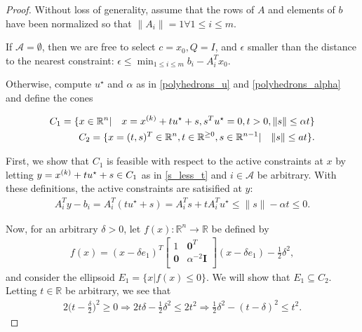 \begin{proof}

Without loss of generality, assume that the rows of $A$ and elements of $b$ have been normalized so that $\|A_i\| = 1 \forall 1 \le i \le m$.

If $\mathcal A = \emptyset$, then we are free to select $c = x_0, Q = I$, and $ \epsilon$ smaller than the distance to the nearest constraint:
$\epsilon \le  \min_{1 \le i \le m} b_i - A_i^Tx_0$.

Otherwise, compute $u^{\star}$ and $\alpha$ as in \cref{polyhedrons_u} and \cref{polyhedrons_alpha} and define the cones

\begin{align}
C_1 = \{x \in \mathbb R^n | \quad x = {x^{(k)}} + t u^{\star}+ s, s^Tu^{\star} = 0, t > 0, \|s\| \le \alpha t\} \label{s_less_t} \\
C_2 = \{x = (t, s)^T \in \mathbb R^n, t \in \mathbb R^{\ge 0}, s \in \mathbb R^{n-1} |\quad \|s\| \le a t \}.
\end{align}

First, we show that $C_1$ is feasible with respect to the active constraints at $x$
by letting $y = {x^{(k)}} + tu^{\star} + s\in C_1$ as in \ref{s_less_t} and $i \in \mathcal A$ be arbitrary.
With these definitions, the active constraints are satisified at $y$:
\begin{align*}
A_{i}^Ty - b_{i} = A_{i}^T(tu^{\star} + s) = A_{i}^Ts + t A_{i}^Tu^{\star} \le \|s\| - \alpha t \le 0.
\end{align*}

Now, for an arbitrary $\delta > 0$, let 
$f(x): \mathbb R^n \to \mathbb R$ be defined by 
\begin{align*}
f(x) = (x - \delta e_1)^T\begin{bmatrix}
1 & \boldsymbol0^T \\
\boldsymbol 0 & \alpha^{-2} \boldsymbol I \\
\end{bmatrix}(x - \delta e_1) - \frac 1 2 \delta^2,
\end{align*} 
and consider the ellipsoid $E_1 = \{x | f(x) \le 0\}$.
We will show that $E_1 \subseteq C_2$.
Letting $t \in \mathbb R$ be arbitrary, we see that
\begin{align*}
2\big(t - \frac {\delta} 2\big)^2 \ge 0
\Longrightarrow 2t\delta - \frac 1 2 \delta^2 \le 2t^2 
\Longrightarrow \frac 1 2 \delta^2 - (t - \delta)^2 \le t^2. 
\end{align*}


\end{proof}
